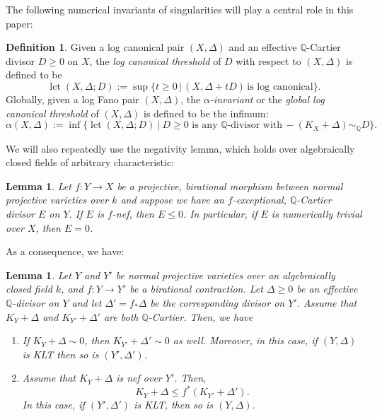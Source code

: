 \documentclass[11pt,reqno]{amsart}
\newcommand{\Q}{\mathbb{Q}}
\DeclareMathOperator{\lct}{lct}
\numberwithin{equation}{section}
\newtheorem{lem}[prop] {Lemma}
\theoremstyle{definition}
\newtheorem{defi}[prop] {Definition}
\begin{document}
The following numerical invariants of singularities will play a central role in this paper:

\begin{defi} \label{def:complexalpha}
    Given a log canonical pair $(X, \Delta)$ and an effective $\Q$-Cartier divisor $D \geq 0$ on $X$, the \emph{log canonical threshold} of $D$ with respect to $(X, \Delta)$ is defined to be
    \[ \lct (X, \Delta; D) := \sup \{ t \geq 0 \, | \, (X, \Delta + tD) \, \text{is log canonical} \}.\]
    Globally, given a log Fano pair $(X, \Delta)$, the \emph{$\alpha$-invariant} or the \emph{global log canonical threshold} of $(X, \Delta)$ is defined to be the infimum:
    \[ \alpha (X, \Delta) := \inf \{ \lct (X, \Delta; D) \ | \ \text{$D \geq 0$ is any $\Q$-divisor with} \,  -(K_X + \Delta) \sim _\Q D\}.  \]
    
\end{defi}

We will also repeatedly use the negativity lemma, which holds over algebraically closed fields of arbitrary characteristic:

\begin{lem} \cite[Section 2.3]{Birkar16} Let $f: Y \to X$ be a projective, birational morphism between normal projective varieties over $k$ and suppose we have an $f$-exceptional, $\Q$-Cartier divisor $E $ on $Y$. If $E$ is $f$-nef, then $E \leq 0$. In particular, if $E$ is numerically trivial over $X$, then $E = 0$.
    
\end{lem}
As a consequence, we have:
\begin{lem} \label{lem:birationalcontraction}
    Let $Y$ and $ Y'$ be normal projective varieties over an algebraically closed field $k$, and $f: Y \to Y' $ be a birational contraction. Let $\Delta \geq 0$ be an effective $\Q$-divisor on $Y$ and let $\Delta ' = f_{*} \Delta$ be the corresponding divisor on $Y'$. Assume that $K_Y +\Delta$ and $K_{Y'} + \Delta'$ are  both $\Q$-Cartier. Then, we have
    
    \begin{enumerate}
        \item If $K_Y 
 + \Delta \sim 0$, then $K_{Y'} + \Delta ' \sim 0$ as well. Moreover, in this case, if $(Y, \Delta)$ is KLT then so is $(Y', \Delta')$.

        \item   Assume that $K_Y + \Delta$ is nef over $Y'$. Then, 
\begin{equation}\label{eq:negativity}
K_Y+\Delta \leq  f^*(K_{Y'}+\Delta').
\end{equation}
In this case, if $(Y', \Delta')$ is KLT, then so is $(Y, \Delta)$.
    \end{enumerate}
\end{lem}
\end{document}
